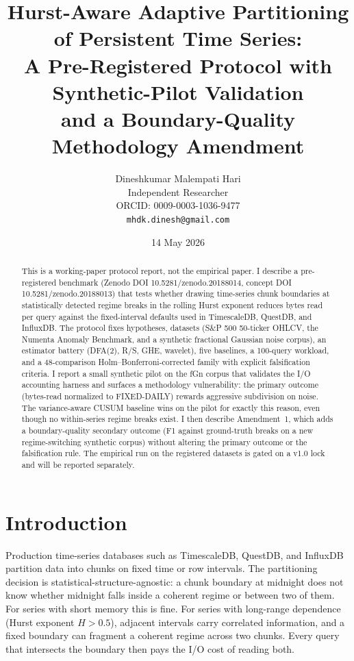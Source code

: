 \documentclass[11pt]{article}
\title{Hurst-Aware Adaptive Partitioning of Persistent Time Series:\\
A Pre-Registered Protocol with Synthetic-Pilot Validation\\
and a Boundary-Quality Methodology Amendment}
\author{Dineshkumar Malempati Hari\\
  Independent Researcher\\
  ORCID: 0009-0003-1036-9477\\
  \texttt{mhdk.dinesh@gmail.com}}
\date{14 May 2026}
\begin{document}
\maketitle

\begin{abstract}
This is a working-paper protocol report, not the empirical paper. I describe a pre-registered benchmark (Zenodo DOI 10.5281/zenodo.20188014, concept DOI 10.5281/zenodo.20188013) that tests whether drawing time-series chunk boundaries at statistically detected regime breaks in the rolling Hurst exponent reduces bytes read per query against the fixed-interval defaults used in TimescaleDB, QuestDB, and InfluxDB. The protocol fixes hypotheses, datasets (S\&P 500 50-ticker OHLCV, the Numenta Anomaly Benchmark, and a synthetic fractional Gaussian noise corpus), an estimator battery (DFA(2), R/S, GHE, wavelet), five baselines, a 100-query workload, and a 48-comparison Holm--Bonferroni-corrected family with explicit falsification criteria. I report a small synthetic pilot on the fGn corpus that validates the I/O accounting harness and surfaces a methodology vulnerability: the primary outcome (bytes-read normalized to FIXED-DAILY) rewards aggressive subdivision on noise. The variance-aware CUSUM baseline wins on the pilot for exactly this reason, even though no within-series regime breaks exist. I then describe Amendment~1, which adds a boundary-quality secondary outcome (F1 against ground-truth breaks on a new regime-switching synthetic corpus) without altering the primary outcome or the falsification rule. The empirical run on the registered datasets is gated on a v1.0 lock and will be reported separately.
\end{abstract}

\section{Introduction}

Production time-series databases such as TimescaleDB, QuestDB, and InfluxDB partition data into chunks on fixed time or row intervals. The partitioning decision is statistical-structure-agnostic: a chunk boundary at midnight does not know whether midnight falls inside a coherent regime or between two of them. For series with short memory this is fine. For series with long-range dependence (Hurst exponent $H>0.5$), adjacent intervals carry correlated information, and a fixed boundary can fragment a coherent regime across two chunks. Every query that intersects the boundary then pays the I/O cost of reading both.
\end{document}
